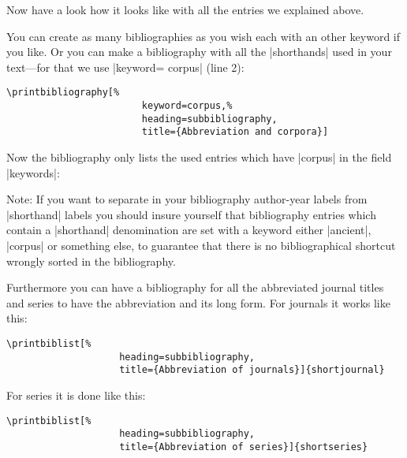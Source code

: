 \documentclass[a4paper,
10pt,
greek,
french,
spanish,
italian,
ngerman,
english
]{ltxdoc}
\begin{document}
\begin{refsection}
\nocite{*}
Now have a look how it looks like with all the entries we explained above.
\begin{bsp}
\renewcommand\bibfont{\normalfont\footnotesize}
\printbibheading[%
							heading=bibliography,%
							title={Bibliography}] %

\printbibliography[%
							keyword=ancient,%
							heading=subbibliography,
							title={Ancient authors and works}]

\printbibliography[%
							notkeyword=ancient,%
							notkeyword=corpus,%
							heading=subbibliography,
							title={Secondary literature}]
\end{bsp}

You can create as many bibliographies as you wish each with an other keyword if you like.
Or you can make a bibliography with all the |shorthands| used in your text---for that we use |keyword= {corpus}| (line 2):
\begin{lstlisting}
\printbibliography[%
						keyword=corpus,%
						heading=subbibliography,
					 	title={Abbreviation and corpora}]
\end{lstlisting}
Now the bibliography only lists the used entries which have |corpus| in the field |keywords|:
\begin{bsp}
\printbibliography[%
						keyword={corpus},
          				heading=subbibliography,
            			title={Abbreviation of corpora}]\label{bib:corpus}
\end{bsp}

Note: If you want to separate in your bibliography author-year labels from |shorthand| labels
 you should insure yourself that bibliography entries which contain a |shorthand| denomination 
are set with a keyword either |ancient|, |corpus| or something else, to guarantee that there is 
no bibliographical shortcut wrongly sorted in the bibliography.


Furthermore you can have a bibliography for all the abbreviated journal titles and series to have the abbreviation and its long form.
For journals it works like this:
\begin{lstlisting}
\printbiblist[%
					heading=subbibliography,
					title={Abbreviation of journals}]{shortjournal}
\end{lstlisting}

\begin{bsp}
\end{bsp}

For series it is done like this:
\begin{lstlisting}
\printbiblist[%
					heading=subbibliography,
					title={Abbreviation of series}]{shortseries}
\end{lstlisting}


\begin{bsp}
\end{bsp}

\end{refsection}
\end{document}
